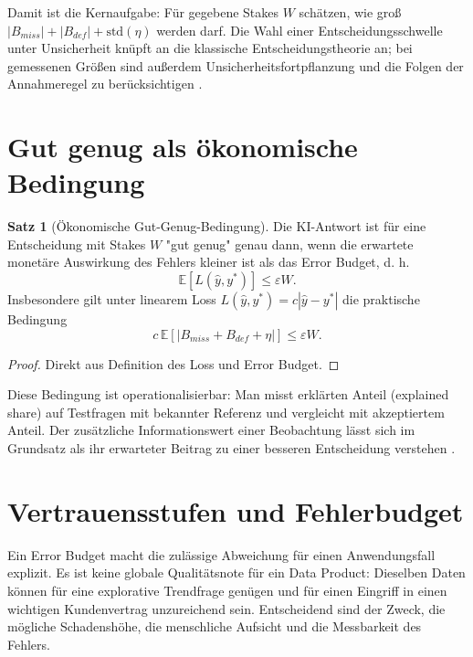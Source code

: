 \documentclass[a4paper,12pt,twoside]{report}
\theoremstyle{definition}
\newtheorem{satz}[definition]{Satz}
\newcommand{\E}{\mathbb{E}}
\begin{document}
Damit ist die Kernaufgabe: Für gegebene Stakes $W$ schätzen, wie groß $|B_{miss}|+|B_{def}|+\mathrm{std}(\eta)$ werden darf.
Die Wahl einer Entscheidungsschwelle unter Unsicherheit knüpft an die klassische Entscheidungstheorie an; bei gemessenen Größen sind außerdem Unsicherheitsfortpflanzung und die Folgen der Annahmeregel zu berücksichtigen \cite{gum08,jcg10612,raiffa68,keeneyraiffa76}.

\section{Gut genug als ökonomische Bedingung}
\begin{satz}[Ökonomische Gut-Genug-Bedingung]
Die KI-Antwort ist für eine Entscheidung mit Stakes $W$ "gut genug" genau dann, wenn die erwartete monetäre Auswirkung des Fehlers kleiner ist als das Error Budget, d. h.
\[
\E[L(\hat y,y^*)] \le \varepsilon W.
\]
Insbesondere gilt unter linearem Loss $L(\hat y,y^*)=c|\hat y-y^*|$ die praktische Bedingung
\[
c\,\E[|B_{miss}+B_{def}+\eta|] \le \varepsilon W.
\]
\end{satz}
\begin{proof}
Direkt aus Definition des Loss und Error Budget.
\end{proof}

Diese Bedingung ist operationalisierbar: Man misst erklärten Anteil (explained share) auf Testfragen mit bekannter Referenz und vergleicht mit akzeptiertem Anteil. Der zusätzliche Informationswert einer Beobachtung lässt sich im Grundsatz als ihr erwarteter Beitrag zu einer besseren Entscheidung verstehen \cite{howard66}.

\section{Vertrauensstufen und Fehlerbudget}
Ein Error Budget macht die zulässige Abweichung für einen Anwendungsfall explizit. Es ist keine globale Qualitätsnote für ein Data Product: Dieselben Daten können für eine explorative Trendfrage genügen und für einen Eingriff in einen wichtigen Kundenvertrag unzureichend sein. Entscheidend sind der Zweck, die mögliche Schadenshöhe, die menschliche Aufsicht und die Messbarkeit des Fehlers.
\end{document}
